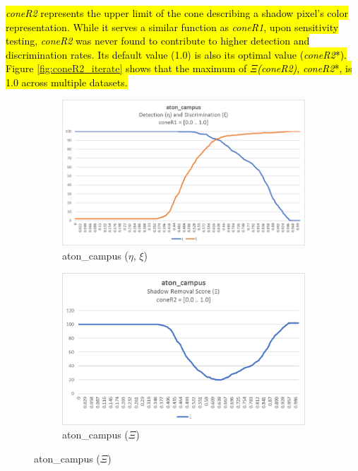 \hl{\textit{coneR2} represents the upper limit of the cone describing a shadow pixel's color representation. While it serves a similar function as \textit{coneR1}, upon sensitivity testing, \textit{coneR2} was never found to contribute to higher detection and discrimination rates. Its default value (1.0) is also its optimal value (\textit{coneR2}*). Figure \ref{fig:coneR2_iterate} shows that the maximum of $\Xi$\textit{(coneR2)}, \textit{coneR2}*, is 1.0 across multiple datasets.}

\begin{figure}
  \begin{subfigure}{.45\linewidth}
  \includegraphics[width=1\linewidth]{figures/campus_coneR1_response.jpg}
  \caption{aton\_campus ($\eta$, $\xi$)}
\end{subfigure}
\hfill
\begin{subfigure}{.45\linewidth}
  \includegraphics[width=1\linewidth]{figures/campus_coneR2_score.jpg}
  \caption{aton\_campus ($\Xi$)}
\end{subfigure}

\end{figure}
